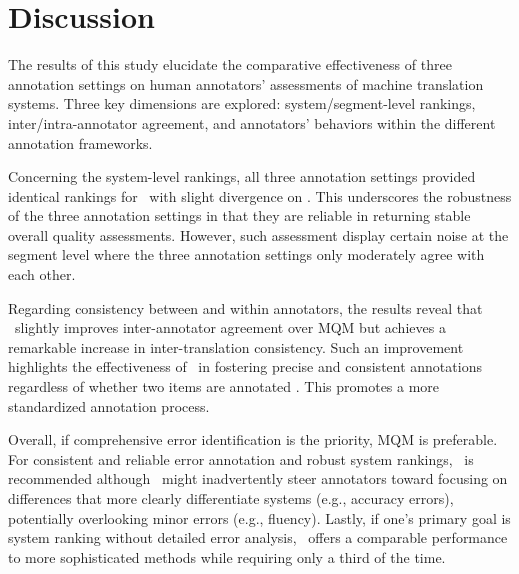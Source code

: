 \section{Discussion}

The results of this study elucidate the comparative effectiveness of three annotation settings on human annotators' assessments of machine translation systems. Three key dimensions are explored: system/segment-level rankings, inter/intra-annotator agreement, and annotators' behaviors within the different annotation frameworks.

Concerning the system-level rankings, all three annotation settings provided identical rankings for \ZhEn~with slight divergence on \EnDe. This underscores the robustness of the three annotation settings in that they are reliable in returning stable overall quality assessments. However, such assessment display certain noise at the segment level where the three annotation settings only moderately agree with each other.

Regarding consistency between and within annotators, 
the results reveal that \sxsmqm~slightly improves inter-annotator agreement over MQM but achieves a remarkable increase in inter-translation consistency. Such an improvement highlights the effectiveness of \sxsmqm~in fostering precise and consistent annotations regardless of whether two items are annotated \sxs. This promotes a more standardized annotation process.

Overall, if comprehensive error identification is the priority, MQM is preferable. For consistent and reliable error annotation and robust system rankings, \sxsmqm~is recommended although \sxsmqm~might inadvertently steer annotators toward focusing on differences that more clearly differentiate systems (e.g., accuracy errors), potentially overlooking minor errors (e.g., fluency). Lastly, if one's primary goal is system ranking without detailed error analysis, \sxsqr~offers a comparable performance to more sophisticated methods while requiring only a third of the time.




